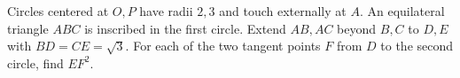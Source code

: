 Circles centered at $O,P$ have radii $2,3$ and touch externally at $A$. An equilateral triangle $ABC$ is inscribed in the first circle. Extend $AB,AC$ beyond $B,C$ to $D,E$ with $BD=CE=\sqrt3$. For each of the two tangent points $F$ from $D$ to the second circle, find $EF^2$.
